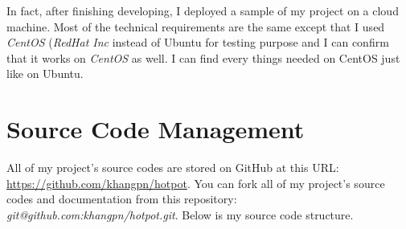 In fact, after finishing developing, I deployed a sample of my project on a cloud machine.
Most of the technical requirements are the same except that I used \emph{CentOS} (\emph{RedHat Inc} instead of Ubuntu for testing purpose and I can confirm that it works on \emph{CentOS} as well.
I can find every things needed on CentOS just like on Ubuntu.


\section{Source Code Management}
\label{ch:implementation:source_code_mangement}  

All of my project's source codes are stored on GitHub at this URL: \href{https://github.com/khangpn/hotpot}{https://github.com/khangpn/hotpot}.
You can fork all of my project's source codes and documentation from this repository: \emph{git@github.com:khangpn/hotpot.git}.
Below is my source code structure.

